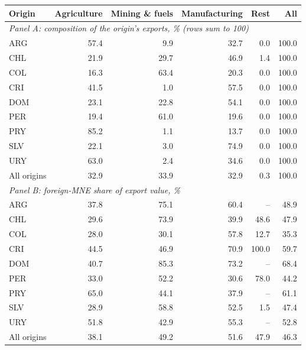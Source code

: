 \begin{tabular}{lrrrrr}
\toprule
Origin & Agriculture & Mining \& fuels & Manufacturing & Rest & All \\
\midrule
\multicolumn{6}{l}{\textit{Panel A: composition of the origin's exports, \% (rows sum to 100)}} \\
ARG & 57.4 & 9.9 & 32.7 & 0.0 & 100.0 \\
CHL & 21.9 & 29.7 & 46.9 & 1.4 & 100.0 \\
COL & 16.3 & 63.4 & 20.3 & 0.0 & 100.0 \\
CRI & 41.5 & 1.0 & 57.5 & 0.0 & 100.0 \\
DOM & 23.1 & 22.8 & 54.1 & 0.0 & 100.0 \\
PER & 19.4 & 61.0 & 19.6 & 0.0 & 100.0 \\
PRY & 85.2 & 1.1 & 13.7 & 0.0 & 100.0 \\
SLV & 22.1 & 3.0 & 74.9 & 0.0 & 100.0 \\
URY & 63.0 & 2.4 & 34.6 & 0.0 & 100.0 \\
All origins & 32.9 & 33.9 & 32.9 & 0.3 & 100.0 \\
\midrule
\multicolumn{6}{l}{\textit{Panel B: foreign-MNE share of export value, \%}} \\
ARG & 37.8 & 75.1 & 60.4 & -- & 48.9 \\
CHL & 29.6 & 73.9 & 39.9 & 48.6 & 47.9 \\
COL & 28.0 & 30.1 & 57.8 & 12.7 & 35.3 \\
CRI & 44.5 & 46.9 & 70.9 & 100.0 & 59.7 \\
DOM & 40.7 & 85.3 & 73.2 & -- & 68.4 \\
PER & 33.0 & 52.2 & 30.6 & 78.0 & 44.2 \\
PRY & 65.0 & 44.1 & 37.9 & -- & 61.1 \\
SLV & 28.9 & 58.8 & 52.5 & 1.5 & 47.4 \\
URY & 51.8 & 42.9 & 55.3 & -- & 52.8 \\
All origins & 38.1 & 49.2 & 51.6 & 47.9 & 46.3 \\
\bottomrule
\end{tabular}

